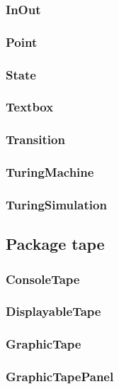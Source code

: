\documentclass[%
  a4paper,%
  11pt,%
  blue,%
  hyperref	%
  ]{tubsartcl}
\begin{document}
\subsubsection{InOut}

\subsubsection{Point}

\subsubsection{State}

\subsubsection{Textbox}

\subsubsection{Transition}

\subsubsection{TuringMachine}

\subsubsection{TuringSimulation}


\subsection{Package tape}

\subsubsection{ConsoleTape}

\subsubsection{DisplayableTape}

\subsubsection{GraphicTape}

\subsubsection{GraphicTapePanel}
\end{document}
